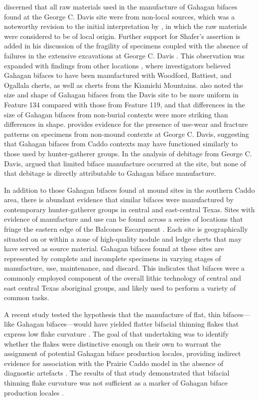 \documentclass[review]{elsarticle}
\begin{document}
\citet{RN3684} discerned that all raw materials used in the manufacture of Gahagan bifaces found at the George C. Davis site were from non-local sources, which was a noteworthy revision to the initial interpretation by \citet{RN800}, in which the raw materials were considered to be of local origin. Further support for Shafer’s assertion is added in his discussion of the fragility of specimens coupled with the absence of failures in the extensive excavations at George C. Davis \citep{RN3684}. This observation was expanded with findings from other locations \citep{RN1001}, where investigators believed Gahagan bifaces to have been manufactured with Woodford, Battiest, and Ogallala cherts, as well as cherts from the Kiamichi Mountains. \citet{RN3684} also noted the size and shape of Gahagan bifaces from the Davis site to be more uniform in Feature 134 compared with those from Feature 119, and that differences in the size of Gahagan bifaces from non-burial contexts were more striking than differences in shape. \citet{RN3684} provides evidence for the presence of use-wear and fracture patterns on specimens from non-mound contexts at George C. Davis, suggesting that Gahagan bifaces from Caddo contexts may have functioned similarly to those used by hunter-gatherer groups. In the analysis of debitage from George C. Davis, \citet{RN3684} argued that limited biface manufacture occurred at the site, but none of that debitage is directly attributable to Gahagan biface manufacture.

In addition to those Gahagan bifaces found at mound sites in the southern Caddo area, there is abundant evidence that similar bifaces were manufactured by contemporary hunter-gatherer groups in central and east-central Texas. Sites with evidence of manufacture and use can be found across a series of locations that fringe the eastern edge of the Balcones Escarpment \citep[Figure 5-3]{RN11568}. Each site is geographically situated on or within a zone of high-quality nodule and ledge cherts that may have served as source material. Gahagan bifaces found at these sites are represented by complete and incomplete specimens in varying stages of manufacture, use, maintenance, and discard. This indicates that bifaces were a commonly employed component of the overall lithic technology of central and east central Texas aboriginal groups, and likely used to perform a variety of common tasks.

A recent study tested the hypothesis that the manufacture of flat, thin bifaces—like Gahagan bifaces—would have yielded flatter bifacial thinning flakes that express low flake curvature \citep{RN11568}. The goal of that undertaking was to identify whether the flakes were distinctive enough on their own to warrant the assignment of potential Gahagan biface production locales, providing indirect evidence for association with the Prairie Caddo model \citep{RN4924} in the absence of diagnostic artefacts \citep{RN11568}. The results of that study demonstrated that bifacial thinning flake curvature was not sufficient as a marker of Gahagan biface production locales \citep{RN11568}.
\end{document}
